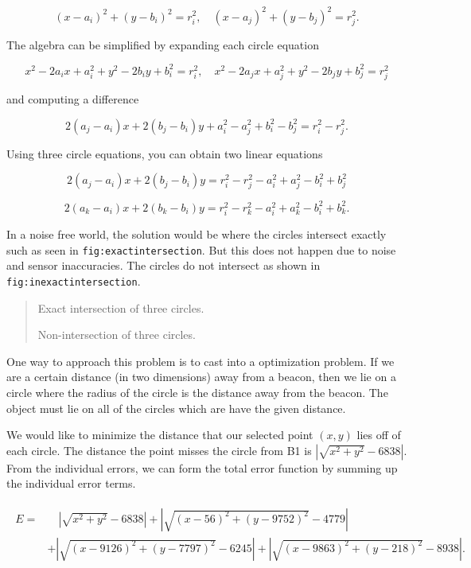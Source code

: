 \[(x-a_i)^2 + (y-b_i)^2 = r_i^2 , \quad (x-a_j)^2 + (y-b_j)^2 = r_j^2 .\]

The algebra can be simplified by expanding each circle equation

\[x^2 - 2a_ix + a_i^2 + y^2 - 2b_iy + b_i^2 = r_i^2 ,
\quad x^2 - 2a_jx + a_j^2 + y^2 - 2b_jy + b_j^2 = r_j^2\]

and computing a difference

\[2(a_j-a_i)x + 2(b_j-b_i)y + a_i^2-a_j^2 + b_i^2-b_j^2 = r_i^2 - r_j^2 .\]

Using three circle equations, you can obtain two linear equations

\[2(a_j-a_i)x + 2(b_j-b_i)y  = r_i^2 - r_j^2 - a_i^2 + a_j^2 - b_i^2 + b_j^2\]

\[2(a_k-a_i)x + 2(b_k-b_i)y = r_i^2 - r_k^2  - a_i^2 + a_k^2 - b_i^2  + b_k^2  .\]

In a noise free world, the solution would be where the circles intersect
exactly such as seen in \texttt{fig:exactintersection}. But this does
not happen due to noise and sensor inaccuracies. The circles do not
intersect as shown in \texttt{fig:inexactintersection}.

\begin{quote}
Exact intersection of three circles.

Non-intersection of three circles.
\end{quote}

One way to approach this problem is to cast into a optimization problem.
If we are a certain distance (in two dimensions) away from a beacon,
then we lie on a circle where the radius of the circle is the distance
away from the beacon. The object must lie on all of the circles which
are have the given distance.

We would like to minimize the distance that our selected point \((x,y)\)
lies off of each circle. The distance the point misses the circle from
B1 is \(|\sqrt{x^2 + y^2} - 6838|\). From the individual errors, we can
form the total error function by summing up the individual error terms.

\[\begin{aligned}
\begin{array}{ll}
E = & \quad  |\sqrt{x^2 + y^2} - 6838|
 + |\sqrt{(x-56)^2 + (y-9752)^2} - 4779|     \\[3mm]
& + |\sqrt{(x-9126)^2  + (y-7797)^2} - 6245|
 + |\sqrt{(x-9863)^2 + (y-218)^2} - 8938|  .
\end{array}
\end{aligned}\]

